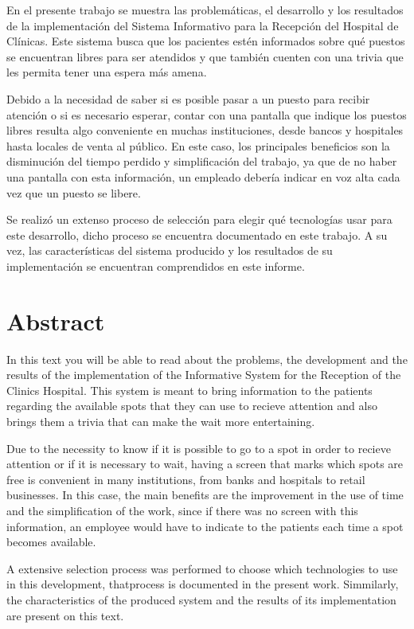 \documentclass{article}
\begin{document}
En el presente trabajo se muestra las problemáticas, el desarrollo y los resultados de la implementación del Sistema Informativo para la Recepción del Hospital de Clínicas. Este sistema busca que los pacientes estén informados sobre qué puestos se encuentran libres para ser atendidos y que también cuenten con una trivia que les permita tener una espera más amena.

Debido a la necesidad de saber si es posible pasar a un puesto para recibir atención o si es necesario esperar, contar con una pantalla que indique los puestos libres resulta algo conveniente en muchas instituciones, desde bancos y hospitales hasta locales de venta al público. En este caso, los principales beneficios son la disminución del tiempo perdido y simplificación del trabajo, ya que de no haber una pantalla con esta información, un empleado debería indicar en voz alta cada vez que un puesto se libere.

Se realizó un extenso proceso de selección para elegir qué tecnologías usar para este desarrollo, dicho proceso se encuentra documentado en este trabajo. A su vez, las características del sistema producido y los resultados de su implementación se encuentran comprendidos en este informe.
\newpage
\
\newpage
\section*{Abstract}

In this text you will be able to read about the problems, the development and the results of the implementation of the Informative System for the Reception of the Clinics Hospital. This system is meant to bring information to the patients regarding the available spots that they can use to recieve attention and also brings them a trivia that can make the wait more entertaining.

Due to the necessity to know if it is possible to go to a spot in order to recieve attention or if it is necessary to wait, having a screen that marks which spots are free is convenient in many institutions, from banks and hospitals to retail businesses. In this case, the main benefits are the improvement in the use of time and the simplification of the work, since if there was no screen with this information, an employee would have to indicate to the patients each time a spot becomes available.

A extensive selection process was performed to choose which technologies to use in this development, thatprocess is documented in the present work. Simmilarly, the characteristics of the produced system and the results of its implementation are present on this text.
\newpage
\
\newpage
\end{document}
